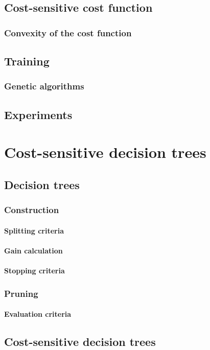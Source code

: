 \documentclass[twoside,openright,titlepage,numbers=noenddot,headinclude,%
               footinclude=true,cleardoublepage=empty,abstractoff,BCOR=5mm,%
               paper=a4,fontsize=11pt,ngerman,american,doublespace]{scrreprt}
\numberwithin{theorem}{chapter}
\numberwithin{definition}{chapter}
\numberwithin{algorithm}{chapter}
\numberwithin{figure}{chapter}
\numberwithin{table}{chapter}
\numberwithin{equation}{chapter}
\begin{document}
		\section{Cost-sensitive cost function}
			\subsection{Convexity of the cost function}
		\section{Training}	
			\subsection{Genetic algorithms}
		\section{Experiments}

	\chapter{Cost-sensitive decision trees}
		\section{Decision trees}
			\subsection{Construction}
				\subsubsection{Splitting criteria}
				\subsubsection{Gain calculation}
				\subsubsection{Stopping criteria}
			\subsection{Pruning}
				\subsubsection{Evaluation criteria}
		\section{Cost-sensitive decision trees}
\end{document}
